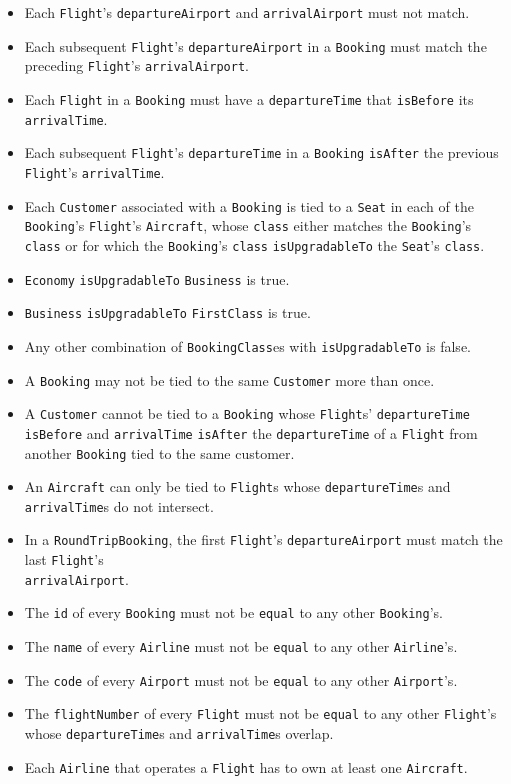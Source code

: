 \documentclass[12pt,a4paper,titlepage]{article}
\def\code#1{\texttt{#1}}
\begin{document}
\begin{itemize}
\item Each \code{Flight}'s \code{departureAirport} and \code{arrivalAirport} must not match.
\item Each subsequent \code{Flight}'s \code{departureAirport} in a \code{Booking} must match the preceding \code{Flight}'s \code{arrivalAirport}.
\item Each \code{Flight} in a \code{Booking} must have a \code{departureTime} that \code{isBefore} its \code{arrivalTime}.
\item Each subsequent \code{Flight}'s \code{departureTime} in a \code{Booking} \code{isAfter} the previous \code{Flight}'s \code{arrivalTime}.
\item Each \code{Customer} associated with a \code{Booking} is tied to a \code{Seat} in each of the \code{Booking}'s \code{Flight}'s \code{Aircraft}, whose \code{class} either matches the \code{Booking}'s \code{class} or for which the \code{Booking}'s \code{class} \code{isUpgradableTo} the \code{Seat}'s \code{class}.
\item \code{Economy} \code{isUpgradableTo} \code{Business} is true.
\item \code{Business} \code{isUpgradableTo} \code{FirstClass} is true.
\item Any other combination of \code{BookingClass}es with \code{isUpgradableTo} is false.
\item A \code{Booking} may not be tied to the same \code{Customer} more than once.
\item A \code{Customer} cannot be tied to a \code{Booking} whose \code{Flight}s' \code{departureTime} \code{isBefore} and \code{arrivalTime} \code{isAfter} the \code{departureTime} of a \code{Flight} from another \code{Booking} tied to the same customer.
\item An \code{Aircraft} can only be tied to \code{Flight}s whose \code{departureTime}s and \code{arrivalTime}s do not intersect.
\item In a \code{RoundTripBooking}, the first \code{Flight}'s \code{departureAirport} must match the last \code{Flight}'s \\\code{arrivalAirport}.
\item The \code{id} of every \code{Booking} must not be \code{equal} to any other \code{Booking}'s.
\item The \code{name} of every \code{Airline} must not be \code{equal} to any other \code{Airline}'s.
\item The \code{code} of every \code{Airport} must not be \code{equal} to any other \code{Airport}'s.
\item The \code{flightNumber} of every \code{Flight} must not be \code{equal} to any other \code{Flight}'s whose \code{departureTime}s and \code{arrivalTime}s overlap.
\item Each \code{Airline} that operates a \code{Flight} has to own at least one \code{Aircraft}.
\end{itemize}
\end{document}
